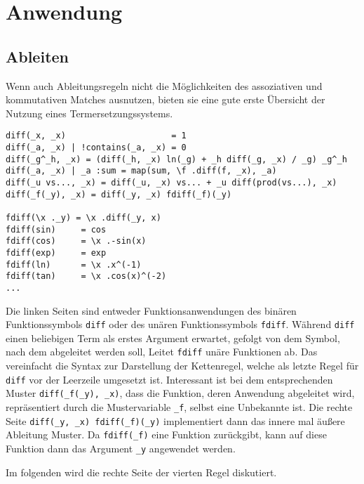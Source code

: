 \section{Anwendung} \label{subsecCppAnwendung}

\subsection{Ableiten}

Wenn auch Ableitungsregeln nicht die Möglichkeiten des assoziativen und kommutativen Matches ausnutzen, bieten sie eine gute erste Übersicht der Nutzung eines Termersetzungssystems.

\begin{verbatim}
diff(_x, _x)                     = 1
diff(_a, _x) | !contains(_a, _x) = 0
diff(_g^_h, _x) = (diff(_h, _x) ln(_g) + _h diff(_g, _x) / _g) _g^_h
diff(_a, _x) | _a :sum = map(sum, \f .diff(f, _x), _a)
diff(_u vs..., _x) = diff(_u, _x) vs... + _u diff(prod(vs...), _x)
diff(_f(_y), _x) = diff(_y, _x) fdiff(_f)(_y)

fdiff(\x ._y) = \x .diff(_y, x)
fdiff(sin)     = cos
fdiff(cos)     = \x .-sin(x)
fdiff(exp)     = exp
fdiff(ln)      = \x .x^(-1)
fdiff(tan)     = \x .cos(x)^(-2)
...
\end{verbatim}

Die linken Seiten sind entweder Funktionsanwendungen des binären Funktionssymbols \verb|diff| oder des unären Funktionssymbols \verb|fdiff|. Während \verb|diff| einen beliebigen Term als erstes Argument erwartet, gefolgt von dem Symbol, nach dem abgeleitet werden soll, Leitet \verb|fdiff| unäre Funktionen ab. Das vereinfacht die Syntax zur Darstellung der Kettenregel, welche als letzte Regel für \verb|diff|  vor der Leerzeile umgesetzt ist. Interessant ist bei dem entsprechenden Muster \verb|diff(_f(_y), _x)|, dass die Funktion, deren Anwendung abgeleitet wird, repräsentiert durch die Mustervariable \verb|_f|, selbst eine Unbekannte ist. Die rechte Seite \verb|diff(_y, _x) fdiff(_f)(_y)| implementiert dann das \glqq innere mal äußere Ableitung \glqq{} Muster. Da \verb|fdiff(_f)| eine Funktion zurückgibt, kann auf diese Funktion dann das Argument \verb|_y| angewendet werden.

Im folgenden wird die rechte Seite der vierten Regel diskutiert.

